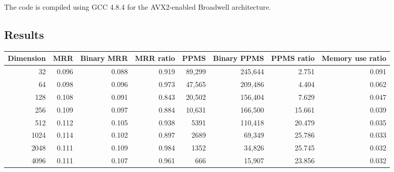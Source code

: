 \documentclass[sigconf]{acmart}
\begin{document}
The code is compiled using GCC 4.8.4 for the AVX2-enabled Broadwell architecture.

\subsection{Results}
\begin{table*}
\centering
\begin{tabular}{rrrrrrrr}
\toprule
Dimension &   MRR & Binary MRR & MRR ratio &   PPMS & Binary PPMS & PPMS ratio & Memory use ratio \\
\midrule
       32 & 0.096 &      0.088 &     0.919 & 89,299 &     245,644 &      2.751 &            0.091 \\
       64 & 0.098 &      0.096 &     0.973 & 47,565 &     209,486 &      4.404 &            0.062 \\
      128 & 0.108 &      0.091 &     0.843 & 20,502 &     156,404 &      7.629 &            0.047 \\
      256 & 0.109 &      0.097 &     0.884 & 10,631 &     166,500 &     15.661 &            0.039 \\
      512 & 0.112 &      0.105 &     0.938 &   5391 &     110,418 &     20.479 &            0.035 \\
     1024 & 0.114 &      0.102 &     0.897 &   2689 &      69,349 &     25.786 &            0.033 \\
     2048 & 0.111 &      0.109 &     0.984 &   1352 &      34,826 &     25.745 &            0.032 \\
     4096 & 0.111 &      0.107 &     0.961 &    666 &      15,907 &     23.856 &            0.032 \\
\bottomrule
\end{tabular}
\end{table*}



\end{document}
